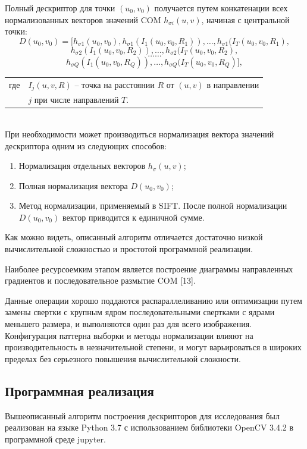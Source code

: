{{{{{		Полный дескриптор для точки $(u_0,v_0)$ получается путем конкатенации всех нормализованных векторов значений COM $h_{\sigma i}(u,v)$, начиная с центральной точки:
		$$D(u_0,v_0) = [h_{\sigma 1}(u_0, v_0), h_{\sigma 1}(I_1(u_0, v_0, R_1)), \dots, h_{\sigma 1}(I_T(u_0, v_0, R_1),$$ 
		$$h_{\sigma 2}(I_1(u_0, v_0, R_2)), \dots, h_{\sigma 2}(I_T(u_0, v_0, R_2),$$
		$$\dots \dots$$
		$$h_{\sigma Q}(I_1(u_0, v_0, R_Q)), \dots, h_{\sigma Q}(I_T(u_0, v_0, R_Q)],$$
		\begin{tabular}{ rl }
			\quad \quad где 
			& $I_j(u, v, R)$ -- точка на расстоянии $R$ от $(u, v)$ в направлении\\
			& $j$ при числе направлений $T$.
		\end{tabular}\\
		
		При необходимости может производиться нормализация вектора значений дескриптора одним из следующих способов:
			\begin{enumerate}
				\item Нормализация отдельных векторов $h_\sigma(u,v)$;
				\item Полная нормализация вектора $D(u_0,v_0)$;
				\item Метод нормализации, применяемый в SIFT. После полной нормализации $D(u_0,v_0)$ вектор приводится к единичной сумме.
			\end{enumerate}
	
	
		Как можно видеть, описанный алгоритм отличается достаточно низкой вычислительной сложностью и простотой программной реализации. 
		
		Наиболее ресурсоемким этапом является построение диаграммы направленных градиентов и последовательное размытие COM [13]. 
		
		Данные операции хорошо поддаются распараллеливанию или оптимизации путем замены свертки с крупным ядром последовательными свертками с ядрами меньшего размера, и выполняются один раз для всего изображения. Конфигурация паттерна выборки и методы нормализации влияют на производительность в незначительной степени, и могут варьироваться в широких пределах без серьезного повышения вычислительной сложности. 
	}
	\newpage
   	\subsection{Программная реализация}{
   		
   		Вышеописанный алгоритм построения дескрипторов для исследования был реализован на языке Python 3.7 с использованием библиотеки OpenCV 3.4.2 в программной среде jupyter.
   		
}}}}}
